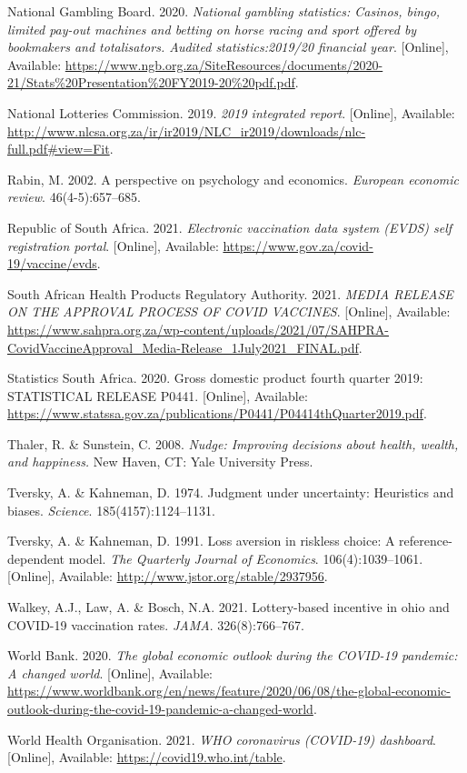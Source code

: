 \documentclass[11pt,preprint, authoryear]{elsarticle}
\numberwithin{equation}{section}
\numberwithin{figure}{section}
\numberwithin{table}{section}
\newlength{\cslhangindent}
\newenvironment{CSLReferences}%
  {\setlength{\parindent}{0pt}%
  \everypar{\setlength{\hangindent}{\cslhangindent}}\ignorespaces}%
  {\par}
\begin{document}
\begin{CSLReferences}{1}{0}
\leavevmode\hypertarget{ref-gamble}{}%
National Gambling Board. 2020. \emph{National gambling statistics:
Casinos, bingo, limited pay-out machines and betting on horse racing and
sport offered by bookmakers and totalisators. Audited statistics:2019/20
financial year}. {[}Online{]}, Available:
\url{https://www.ngb.org.za/SiteResources/documents/2020-21/Stats\%20Presentation\%20FY2019-20\%20pdf.pdf}.

\leavevmode\hypertarget{ref-lotto}{}%
National Lotteries Commission. 2019. \emph{2019 integrated report}.
{[}Online{]}, Available:
\url{http://www.nlcsa.org.za/ir/ir2019/NLC_ir2019/downloads/nlc-full.pdf\#view=Fit}.

\leavevmode\hypertarget{ref-rabin}{}%
Rabin, M. 2002. A perspective on psychology and economics.
\emph{European economic review}. 46(4-5):657--685.

\leavevmode\hypertarget{ref-evds}{}%
Republic of South Africa. 2021. \emph{Electronic vaccination data system
(EVDS) self registration portal}. {[}Online{]}, Available:
\url{https://www.gov.za/covid-19/vaccine/evds}.

\leavevmode\hypertarget{ref-sah}{}%
South African Health Products Regulatory Authority. 2021. \emph{MEDIA
RELEASE ON THE APPROVAL PROCESS OF COVID VACCINES}. {[}Online{]},
Available:
\url{https://www.sahpra.org.za/wp-content/uploads/2021/07/SAHPRA-CovidVaccineApproval_Media-Release_1July2021_FINAL.pdf}.

\leavevmode\hypertarget{ref-statsa}{}%
Statistics South Africa. 2020. Gross domestic product fourth quarter
2019: STATISTICAL RELEASE P0441. {[}Online{]}, Available:
\url{https://www.statssa.gov.za/publications/P0441/P04414thQuarter2019.pdf}.

\leavevmode\hypertarget{ref-nudge}{}%
Thaler, R. \& Sunstein, C. 2008. \emph{Nudge: Improving decisions about
health, wealth, and happiness.} New Haven, CT: Yale University Press.

\leavevmode\hypertarget{ref-khan}{}%
Tversky, A. \& Kahneman, D. 1974. Judgment under uncertainty: Heuristics
and biases. \emph{Science}. 185(4157):1124--1131.

\leavevmode\hypertarget{ref-ref}{}%
Tversky, A. \& Kahneman, D. 1991. Loss aversion in riskless choice: A
reference-dependent model. \emph{The Quarterly Journal of Economics}.
106(4):1039--1061. {[}Online{]}, Available:
\url{http://www.jstor.org/stable/2937956}.

\leavevmode\hypertarget{ref-ohio}{}%
Walkey, A.J., Law, A. \& Bosch, N.A. 2021. Lottery-based incentive in
ohio and COVID-19 vaccination rates. \emph{JAMA}. 326(8):766--767.

\leavevmode\hypertarget{ref-bank}{}%
World Bank. 2020. \emph{The global economic outlook during the COVID-19
pandemic: A changed world}. {[}Online{]}, Available:
\url{https://www.worldbank.org/en/news/feature/2020/06/08/the-global-economic-outlook-during-the-covid-19-pandemic-a-changed-world}.

\leavevmode\hypertarget{ref-who}{}%
World Health Organisation. 2021. \emph{WHO coronavirus (COVID-19)
dashboard}. {[}Online{]}, Available:
\url{https://covid19.who.int/table}.

\end{CSLReferences}


\end{document}
